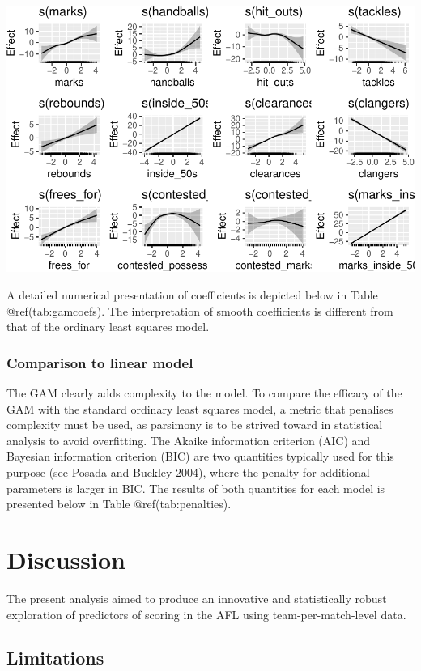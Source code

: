 \documentclass{article}
\begin{document}
\includegraphics{OLET5608_TrentHenderson_files/figure-latex/gamsmooths-1.pdf}

A detailed numerical presentation of coefficients is depicted below in
Table @ref(tab:gamcoefs). The interpretation of smooth coefficients is
different from that of the ordinary least squares model.

\hypertarget{comparison-to-linear-model}{%
\subsubsection{Comparison to linear
model}\label{comparison-to-linear-model}}

The GAM clearly adds complexity to the model. To compare the efficacy of
the GAM with the standard ordinary least squares model, a metric that
penalises complexity must be used, as parsimony is to be strived toward
in statistical analysis to avoid overfitting. The Akaike information
criterion (AIC) and Bayesian information criterion (BIC) are two
quantities typically used for this purpose (see Posada and Buckley
2004), where the penalty for additional parameters is larger in BIC. The
results of both quantities for each model is presented below in Table
@ref(tab:penalties).

\hypertarget{discussion}{%
\section{Discussion}\label{discussion}}

The present analysis aimed to produce an innovative and statistically
robust exploration of predictors of scoring in the AFL using
team-per-match-level data.

\hypertarget{limitations}{%
\subsection{Limitations}\label{limitations}}
\end{document}
